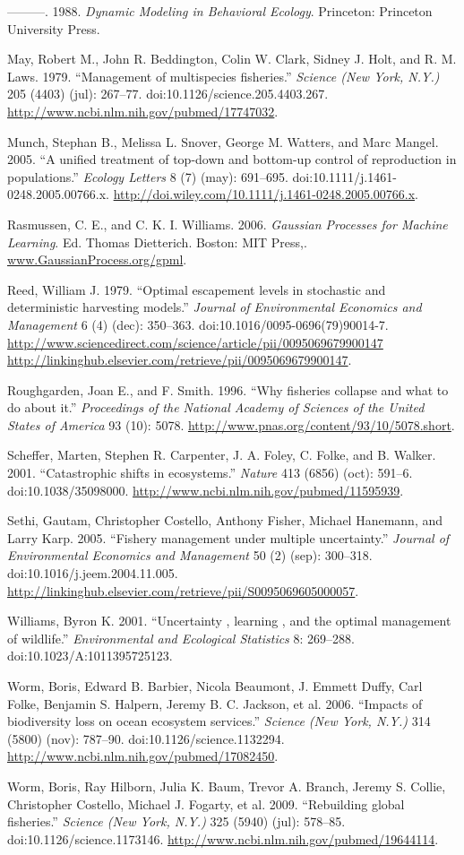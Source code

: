 \documentclass[author-year, review]{elsarticle} %
\begin{document}
---------. 1988. \emph{Dynamic Modeling in Behavioral Ecology}.
Princeton: Princeton University Press.

May, Robert M., John R. Beddington, Colin W. Clark, Sidney J. Holt, and
R. M. Laws. 1979. ``Management of multispecies fisheries.''
\emph{Science (New York, N.Y.)} 205 (4403) (jul): 267--77.
doi:10.1126/science.205.4403.267.
\url{http://www.ncbi.nlm.nih.gov/pubmed/17747032}.

Munch, Stephan B., Melissa L. Snover, George M. Watters, and Marc
Mangel. 2005. ``A unified treatment of top-down and bottom-up control of
reproduction in populations.'' \emph{Ecology Letters} 8 (7) (may):
691--695. doi:10.1111/j.1461-0248.2005.00766.x.
\url{http://doi.wiley.com/10.1111/j.1461-0248.2005.00766.x}.

Rasmussen, C. E., and C. K. I. Williams. 2006. \emph{Gaussian Processes
for Machine Learning}. Ed. Thomas Dietterich. Boston: MIT Press,.
\url{www.GaussianProcess.org/gpml}.

Reed, William J. 1979. ``Optimal escapement levels in stochastic and
deterministic harvesting models.'' \emph{Journal of Environmental
Economics and Management} 6 (4) (dec): 350--363.
doi:10.1016/0095-0696(79)90014-7.
\href{http://www.sciencedirect.com/science/article/pii/0095069679900147 http://linkinghub.elsevier.com/retrieve/pii/0095069679900147}{http://www.sciencedirect.com/science/article/pii/0095069679900147
http://linkinghub.elsevier.com/retrieve/pii/0095069679900147}.

Roughgarden, Joan E., and F. Smith. 1996. ``Why fisheries collapse and
what to do about it.'' \emph{Proceedings of the National Academy of
Sciences of the United States of America} 93 (10): 5078.
\url{http://www.pnas.org/content/93/10/5078.short}.

Scheffer, Marten, Stephen R. Carpenter, J. A. Foley, C. Folke, and B.
Walker. 2001. ``Catastrophic shifts in ecosystems.'' \emph{Nature} 413
(6856) (oct): 591--6. doi:10.1038/35098000.
\url{http://www.ncbi.nlm.nih.gov/pubmed/11595939}.

Sethi, Gautam, Christopher Costello, Anthony Fisher, Michael Hanemann,
and Larry Karp. 2005. ``Fishery management under multiple uncertainty.''
\emph{Journal of Environmental Economics and Management} 50 (2) (sep):
300--318. doi:10.1016/j.jeem.2004.11.005.
\url{http://linkinghub.elsevier.com/retrieve/pii/S0095069605000057}.

Williams, Byron K. 2001. ``Uncertainty , learning , and the optimal
management of wildlife.'' \emph{Environmental and Ecological Statistics}
8: 269--288. doi:10.1023/A:1011395725123.

Worm, Boris, Edward B. Barbier, Nicola Beaumont, J. Emmett Duffy, Carl
Folke, Benjamin S. Halpern, Jeremy B. C. Jackson, et al. 2006. ``Impacts
of biodiversity loss on ocean ecosystem services.'' \emph{Science (New
York, N.Y.)} 314 (5800) (nov): 787--90. doi:10.1126/science.1132294.
\url{http://www.ncbi.nlm.nih.gov/pubmed/17082450}.

Worm, Boris, Ray Hilborn, Julia K. Baum, Trevor A. Branch, Jeremy S.
Collie, Christopher Costello, Michael J. Fogarty, et al. 2009.
``Rebuilding global fisheries.'' \emph{Science (New York, N.Y.)} 325
(5940) (jul): 578--85. doi:10.1126/science.1173146.
\url{http://www.ncbi.nlm.nih.gov/pubmed/19644114}.
\end{document}
